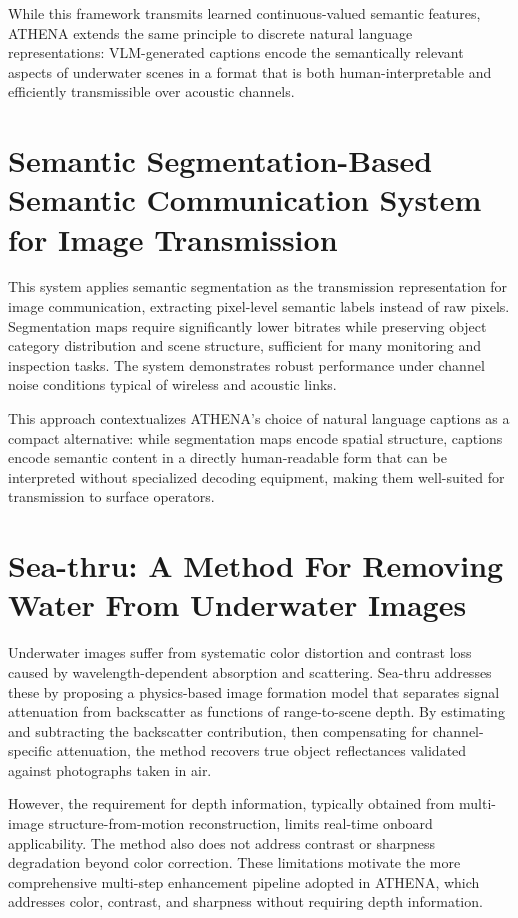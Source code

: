 While this framework transmits learned continuous-valued semantic features, ATHENA extends the same principle to discrete natural language representations: VLM-generated captions encode the semantically relevant aspects of underwater scenes in a format that is both human-interpretable and efficiently transmissible over acoustic channels.

\section[J. Wu, C. Wu, Lin, Yoshinaga, Zhong, Chen \& Ji]{Semantic Segmentation-Based Semantic Communication System for Image Transmission~\cite{wu2023semantic}}
This system applies semantic segmentation as the transmission representation for image communication, extracting pixel-level semantic labels instead of raw pixels. Segmentation maps require significantly lower bitrates while preserving object category distribution and scene structure, sufficient for many monitoring and inspection tasks. The system demonstrates robust performance under channel noise conditions typical of wireless and acoustic links.

This approach contextualizes ATHENA's choice of natural language captions as a compact alternative: while segmentation maps encode spatial structure, captions encode semantic content in a directly human-readable form that can be interpreted without specialized decoding equipment, making them well-suited for transmission to surface operators.

\section[Akkaynak \& Treibitz]{Sea-thru: A Method For Removing Water From Underwater Images~\cite{seathru}}
Underwater images suffer from systematic color distortion and contrast loss caused by wavelength-dependent absorption and scattering. Sea-thru addresses these by proposing a physics-based image formation model that separates signal attenuation from backscatter as functions of range-to-scene depth. By estimating and subtracting the backscatter contribution, then compensating for channel-specific attenuation, the method recovers true object reflectances validated against photographs taken in air.

However, the requirement for depth information, typically obtained from multi-image structure-from-motion reconstruction, limits real-time onboard applicability. The method also does not address contrast or sharpness degradation beyond color correction. These limitations motivate the more comprehensive multi-step enhancement pipeline adopted in ATHENA, which addresses color, contrast, and sharpness without requiring depth information.

